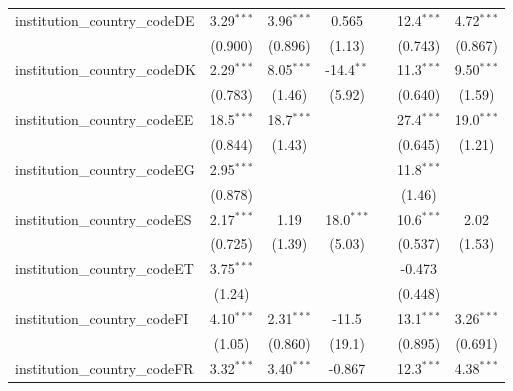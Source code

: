 \begin{tabular}{lcccccc}
   institution\_country\_codeDE          & 3.29$^{***}$   & 3.96$^{***}$  & 0.565         &            & 12.4$^{***}$  & 4.72$^{***}$\\   
                                         & (0.900)        & (0.896)       & (1.13)        &            & (0.743)       & (0.867)\\   
   institution\_country\_codeDK          & 2.29$^{***}$   & 8.05$^{***}$  & -14.4$^{**}$  &            & 11.3$^{***}$  & 9.50$^{***}$\\   
                                         & (0.783)        & (1.46)        & (5.92)        &            & (0.640)       & (1.59)\\   
   institution\_country\_codeEE          & 18.5$^{***}$   & 18.7$^{***}$  &               &            & 27.4$^{***}$  & 19.0$^{***}$\\   
                                         & (0.844)        & (1.43)        &               &            & (0.645)       & (1.21)\\   
   institution\_country\_codeEG          & 2.95$^{***}$   &               &               &            & 11.8$^{***}$  &   \\   
                                         & (0.878)        &               &               &            & (1.46)        &   \\   
   institution\_country\_codeES          & 2.17$^{***}$   & 1.19          & 18.0$^{***}$  &            & 10.6$^{***}$  & 2.02\\   
                                         & (0.725)        & (1.39)        & (5.03)        &            & (0.537)       & (1.53)\\   
   institution\_country\_codeET          & 3.75$^{***}$   &               &               &            & -0.473        &   \\   
                                         & (1.24)         &               &               &            & (0.448)       &   \\   
   institution\_country\_codeFI          & 4.10$^{***}$   & 2.31$^{***}$  & -11.5         &            & 13.1$^{***}$  & 3.26$^{***}$\\   
                                         & (1.05)         & (0.860)       & (19.1)        &            & (0.895)       & (0.691)\\   
   institution\_country\_codeFR          & 3.32$^{***}$   & 3.40$^{***}$  & -0.867        &            & 12.3$^{***}$  & 4.38$^{***}$\\   

\end{tabular}
